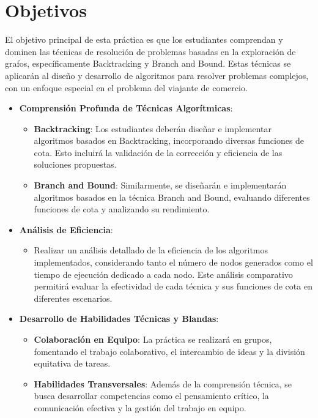 \documentclass{article}
\begin{document}
        
\newpage
\section{Objetivos}

El objetivo principal de esta práctica es que los estudiantes comprendan y dominen las técnicas de resolución de problemas basadas en la exploración de grafos, específicamente Backtracking y Branch and Bound. Estas técnicas se aplicarán al diseño y desarrollo de algoritmos para resolver problemas complejos, con un enfoque especial en el problema del viajante de comercio.

\begin{itemize}
    \item \textbf{Comprensión Profunda de Técnicas Algorítmicas}:
        \begin{itemize}
            \item \textbf{Backtracking}: Los estudiantes deberán diseñar e implementar algoritmos basados en Backtracking, incorporando diversas funciones de cota. Esto incluirá la validación de la corrección y eficiencia de las soluciones propuestas.
            \item \textbf{Branch and Bound}: Similarmente, se diseñarán e implementarán algoritmos basados en la técnica Branch and Bound, evaluando diferentes funciones de cota y analizando su rendimiento.
        \end{itemize}
    \item \textbf{Análisis de Eficiencia}:
        \begin{itemize}
            \item Realizar un análisis detallado de la eficiencia de los algoritmos implementados, considerando tanto el número de nodos generados como el tiempo de ejecución dedicado a cada nodo. Este análisis comparativo permitirá evaluar la efectividad de cada técnica y sus funciones de cota en diferentes escenarios.
        \end{itemize}
    \item \textbf{Desarrollo de Habilidades Técnicas y Blandas}:
        \begin{itemize}
            \item \textbf{Colaboración en Equipo}: La práctica se realizará en grupos, fomentando el trabajo colaborativo, el intercambio de ideas y la división equitativa de tareas.
            \item \textbf{Habilidades Transversales}: Además de la comprensión técnica, se busca desarrollar competencias como el pensamiento crítico, la comunicación efectiva y la gestión del trabajo en equipo.

\end{itemize}
\end{itemize}
\end{document}
